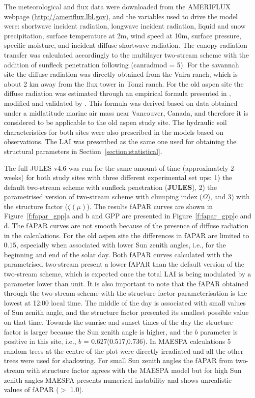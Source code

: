 \documentclass[a4paper,11pt]{report}
\begin{document}
The meteorological and flux data were downloaded from the AMERIFLUX webpage (\url{http://ameriflux.lbl.gov}), and the variables used to drive the model were: shortwave incident radiation, longwave incident radiation, liquid and snow precipitation, surface temperature at 2m, wind speed at 10m, surface pressure, specific moisture, and incident diffuse shortwave radiation. The canopy radiation transfer was calculated accordingly to the multilayer two-stream scheme with the addition of sunfleck penetration following \citet{Dai2004} (can\textunderscore rad\textunderscore mod = 5). For the savannah site the diffuse radiation was directly obtained from the Vaira ranch, which is about 2 km away from the flux tower in Tonzi ranch. For the old aspen site the diffuse radiation was estimated through an empirical formula presented in \citet{Erbs1982}, modified and validated by \citet{Black1991}. This formula was derived based on data obtained under a midlatitude marine air mass near Vancouver, Canada, and therefore it is considered to be applicable to the old aspen study site. The hydraulic soil characteristics for both sites were also prescribed in the models based on observations. The LAI was prescribed as the same one used for obtaining the structural parameters in Section~\ref{section:statistical}. 

The full JULES v4.6 was run for the same amount of time (approximately 2 weeks) for both study sites with three different experimental set ups: 1) the default two-stream scheme with sunfleck penetration (\textbf{JULES}), 2) the parametrised version of two-stream scheme with clumping index (\textbf{$\Omega$}), and 3) with the structure factor (\textbf{$\zeta(\mu)$}). The results fAPAR curves are shown in Figure~\ref{f:fapar_gpp}a and b and GPP are presented in Figure~\ref{f:fapar_gpp}c and d. The fAPAR curves are not smooth because of the presence of diffuse radiation in the calculations. For the old aspen site the differences in fAPAR are limited to 0.15, especially when associated with lower Sun zenith angles, i.e., for the beginning and end of the solar day. Both fAPAR curves calculated with the parametrised two-stream present a lower fAPAR than the default version of the two-stream scheme, which is expected once the total LAI is being modulated by a parameter lower than unit. It is also important to note that the fAPAR obtained through the two-stream scheme with the structure factor parameterisation is the lowest at 12:00 local time. The middle of the day is associated with small values of Sun zenith angle, and the structure factor presented its smallest possible value on that time. Towards the sunrise and sunset times of the day the structure factor is larger because the Sun zenith angle is higher, and the $b$ parameter is positive in this site, i.e., $b$ = 0.627(0.517,0.736).
In MAESPA calculations 5 random trees at the centre of the plot were directly irradiated and all the other trees were used for shadowing. For small Sun zenith angles the fAPAR from two-stream with structure factor agrees with the MAESPA model but for high Sun zenith angles MAESPA presents numerical instability and shows unrealistic values of fAPAR ($>$ 1.0).
\end{document}
